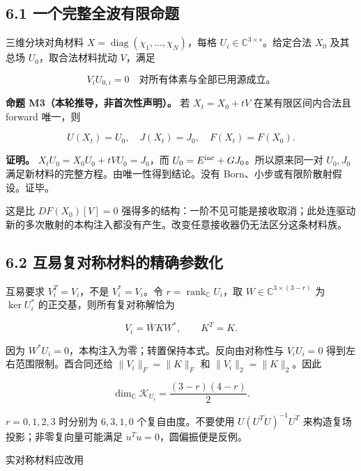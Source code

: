 \documentclass[11pt,a4paper]{article}
\begin{document}
\hypertarget{ux4e00ux4e2aux5b8cux6574ux5168ux6ce2ux6709ux9650ux547dux9898}{%
\subsection{6.1
一个完整全波有限命题}\label{ux4e00ux4e2aux5b8cux6574ux5168ux6ce2ux6709ux9650ux547dux9898}}

三维分块对角材料 \(X=\operatorname{diag}(\chi_1,\ldots,\chi_N)\)，每格
\(U_i\in\mathbb C^{3\times s}\)。给定合法 \(X_0\) 及其总场
\(U_0\)，取合法材料扰动 \(V\)，满足

\[
\boxed{V_iU_{0,i}=0\quad\text{对所有体素与全部已用源成立。}}
\]

\textbf{命题 M3（本轮推导，非首次性声明）。} 若 \(X_t=X_0+tV\)
在某有限区间内合法且 forward 唯一，则

\[
\boxed{U(X_t)=U_0,\quad J(X_t)=J_0,\quad F(X_t)=F(X_0).}
\]

\textbf{证明。} \(X_tU_0=X_0U_0+tVU_0=J_0\)，而
\(U_0=E^{\rm inc}+GJ_0\)。所以原来同一对 \(U_0,J_0\)
满足新材料的完整方程。由唯一性得到结论。没有
Born、小步或有限阶散射假设。证毕。

这是比 \(DF(X_0)[V]=0\)
强得多的结构：一阶不见可能是接收取消；此处连驱动新的多次散射的本构注入都没有产生。改变任意接收器仍无法区分这条材料族。

\hypertarget{ux4e92ux6613ux590dux5bf9ux79f0ux6750ux6599ux7684ux7cbeux786eux53c2ux6570ux5316}{%
\subsection{6.2
互易复对称材料的精确参数化}\label{ux4e92ux6613ux590dux5bf9ux79f0ux6750ux6599ux7684ux7cbeux786eux53c2ux6570ux5316}}

互易要求 \(V_i^T=V_i\)，不是 \(V_i^*=V_i\)。令
\(r=\operatorname{rank}_{\mathbb C}U_i\)，取
\(W\in\mathbb C^{3\times(3-r)}\) 为 \(\ker U_i^*\)
的正交基，则所有复对称解恰为

\[
\boxed{V_i=\overline W K W^*,\qquad K^T=K.}
\]

因为 \(W^*U_i=0\)，本构注入为零；转置保持本式。反向由对称性与
\(V_iU_i=0\) 得到左右范围限制。酉合同还给 \(\|V_i\|_F=\|K\|_F\) 和
\(\|V_i\|_2=\|K\|_2\)。因此

\[
\dim_{\mathbb C}\mathcal K_{U_i}
=\frac{(3-r)(4-r)}2.
\]

\(r=0,1,2,3\) 时分别为 \(6,3,1,0\) 个复自由度。不要使用
\(U(U^TU)^{-1}U^T\) 来构造复场投影；非零复向量可能满足
\(u^Tu=0\)，圆偏振便是反例。

实对称材料应改用
\end{document}

